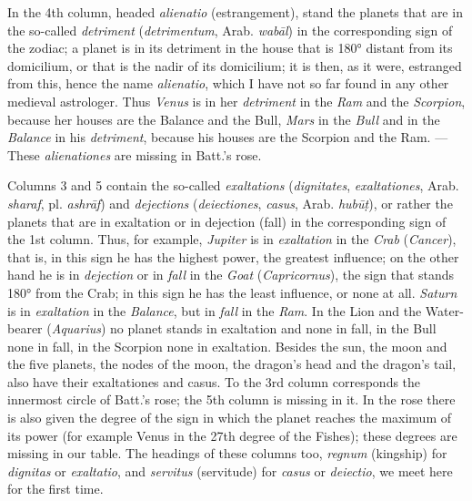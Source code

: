 \documentclass[11pt]{article}
\newcommand{\Pg}[1]{\marginpar{\footnotesize\color{gray}#1}}
\begin{document}
\par In the 4th column, headed \emph{alienatio} (estrangement), stand the planets that are in the so-called \emph{detriment} (\emph{detrimentum}, Arab. \emph{wabāl}) in the corresponding sign of the zodiac; a planet is in its detriment in the house that is 180° distant from its domicilium, or that is the nadir of its domicilium; it is then, as it were, estranged from this, hence the name \emph{alienatio}, which I have not so far found in any other medieval astrologer. Thus \emph{Venus} is in her \emph{detriment} in the \emph{Ram} and the \emph{Scorpion}, because her houses are the Balance and the Bull, \emph{Mars} in the \emph{Bull} and in the \emph{Balance} in \Pg{104}his \emph{detriment}, because his houses are the Scorpion and the Ram. — These \emph{alienationes} are missing in Batt.'s rose.\par
\par Columns 3 and 5 contain the so-called \emph{exaltations} (\emph{dignitates}, \emph{exaltationes}, Arab. \emph{sharaf}, pl. \emph{ashrāf}) and \emph{dejections} (\emph{deiectiones}, \emph{casus}, Arab. \emph{hubūṭ}), or rather the planets that are in exaltation or in dejection (fall) in the corresponding sign of the 1st column. Thus, for example, \emph{Jupiter} is in \emph{exaltation} in the \emph{Crab} (\emph{Cancer}), that is, in this sign he has the highest power, the greatest influence; on the other hand he is in \emph{dejection} or in \emph{fall} in the \emph{Goat} (\emph{Capricornus}), the sign that stands 180° from the Crab; in this sign he has the least influence, or none at all. \emph{Saturn} is in \emph{exaltation} in the \emph{Balance}, but in \emph{fall} in the \emph{Ram}. In the Lion and the Water-bearer (\emph{Aquarius}) no planet stands in exaltation and none in fall, in the Bull none in fall, in the Scorpion none in exaltation. Besides the sun, the moon and the five planets, the nodes of the moon, the dragon's head and the dragon's tail, also have their exaltationes and casus. To the 3rd column corresponds the innermost circle of Batt.'s rose; the 5th column is missing in it. In the rose there is also given the degree of the sign in which the planet reaches the maximum of its power (for example Venus in the 27th degree of the Fishes); these degrees are missing in our table. The headings of these columns too, \emph{regnum} (kingship) for \emph{dignitas} or \emph{exaltatio}, and \emph{servitus} (servitude) for \emph{casus} or \emph{deiectio}, we meet here for the first time.\par
\end{document}
